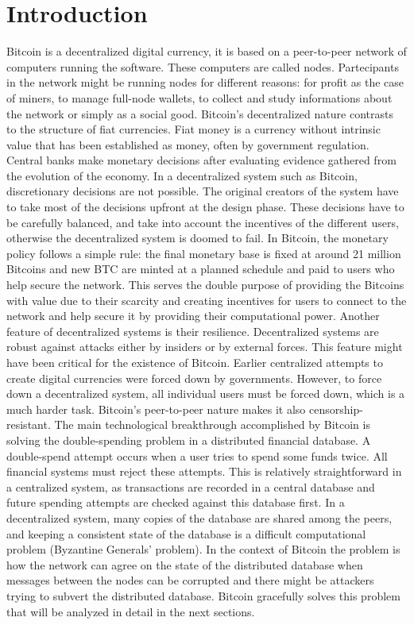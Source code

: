 \documentclass{article}
\begin{document}
\section*{Introduction}
Bitcoin is a decentralized digital currency, it is based on a peer-to-peer network of computers running the software. These computers are called nodes. Partecipants in the network might be running nodes for different reasons: for profit as the case of miners, to manage full-node wallets, to collect and study informations about the network or simply as a social good.\newline
Bitcoin’s decentralized nature contrasts to the structure of fiat currencies.\newline
Fiat money is a currency without intrinsic value that has been established as money, often by government regulation.\newline
Central banks make monetary decisions after evaluating evidence gathered from the evolution of the economy. In a decentralized system such as Bitcoin, discretionary decisions are not possible. The original creators of the system have to take most of the decisions upfront at the design phase. These decisions have to be carefully balanced, and take into account the incentives of the different users, otherwise the decentralized system is doomed to fail. In Bitcoin, the monetary policy follows a simple rule: the final monetary base is fixed at around 21 million Bitcoins and new BTC are minted at a planned schedule and paid to users who help secure the network. This serves the double purpose of providing the Bitcoins with value due to their scarcity and creating incentives for users to connect to the network and help secure it by providing their computational power.\newline
Another feature of decentralized systems is their resilience. Decentralized systems are robust against attacks either by insiders or by external forces. This feature might have been critical for the existence of Bitcoin. Earlier centralized attempts to create digital currencies were forced down by governments. However, to force down a decentralized system, all individual users must be forced down, which is a much harder task. Bitcoin’s peer-to-peer nature makes it also censorship-resistant.\newline
The main technological breakthrough accomplished by Bitcoin is solving the double-spending problem in a distributed financial database. A double-spend attempt occurs when a user tries to spend some funds twice. All financial systems must reject these attempts. This is relatively straightforward in a centralized system, as transactions are recorded in a central database and future spending attempts are checked against this database first. In a decentralized system, many copies of the database are shared among the peers, and keeping a consistent state of the database is a difficult computational problem (Byzantine Generals’ problem). In the context of Bitcoin the problem is how the network can agree on the state of the distributed database when messages between the nodes can be corrupted and there might be attackers trying to subvert the distributed database. Bitcoin gracefully solves this problem that will be analyzed in detail in the next sections.
\end{document}

